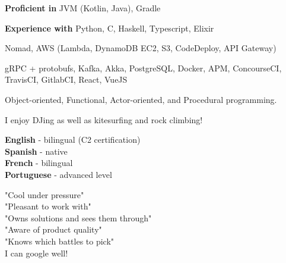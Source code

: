 \documentclass[9pt]{developercv}
\newcommand{\para}{\vspace{0.4em}}
\begin{document}
    \vspace{1em}
    \begin{minipage}[t]{0.62\textwidth}
        \vspace{-\baselineskip} %


        \vspace{-0.5em}
        \textbf{Proficient in} JVM (Kotlin, Java), Gradle

        \para
        \textbf{Experience with}
        Python, C, Haskell, Typescript, Elixir

        \para

        Nomad, AWS (Lambda, DynamoDB EC2, S3, CodeDeploy, API Gateway)

        \para

        gRPC + protobufs, Kafka, Akka, PostgreSQL, Docker, APM, ConcourseCI, TravisCI, GitlabCI, React,
        VueJS

        \para

        Object-oriented, Functional, Actor-oriented, and Procedural programming.
        \\


        \vspace{-0.5em}
        I enjoy DJing as well as kitesurfing and rock climbing!
    \end{minipage}
    \hfill
    \begin{minipage}[t]{0.35\textwidth}
        \vspace{-\baselineskip} %

        \vspace{-0.5em}
        \textbf{English} - bilingual (C2 certification)\\
        \textbf{Spanish} - native\\
        \textbf{French} - bilingual\\
        \textbf{Portuguese} - advanced level\\


        \vspace{-0.5em}
        "Cool under pressure"\\
        "Pleasant to work with"\\
        "Owns solutions and sees them through"\\
        "Aware of product quality"\\
        "Knows which battles to pick"\\
        I can google well!
    \end{minipage}
    \vspace{1.2em}
    \hfill
%

\end{document}
